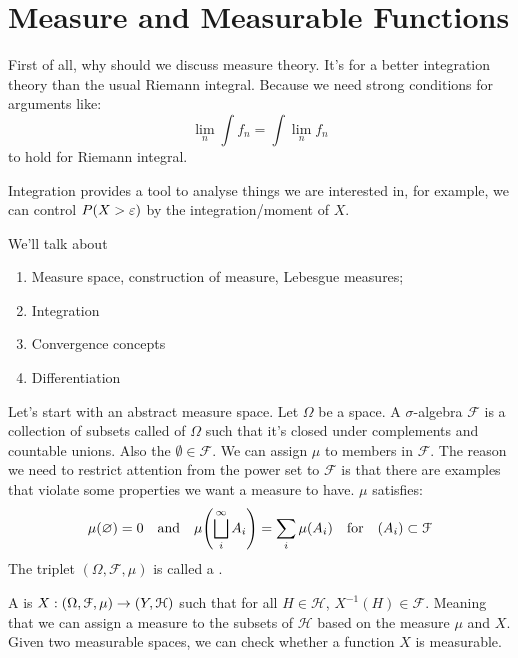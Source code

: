 \section{Measure and Measurable Functions}
First of all, why should we discuss measure theory. It's for a better integration theory than the usual Riemann integral. Because we need strong conditions for arguments like:
\begin{equation*}
    \lim_{n} \int f_{n} = \int \lim_{n} f_{n}
\end{equation*}
to hold for Riemann integral.

Integration provides a tool to analyse things we are interested in, for example, we can control \(P\pqty{X > \epsilon}\) by the integration/moment of \(X\). 

 We'll talk about
\begin{enumerate}
    \item Measure space, construction of measure, Lebesgue measures;
    \item Integration
    \item Convergence concepts 
    \item Differentiation 
\end{enumerate}

Let's start with an abstract measure space. Let \(\Omega\) be a space. A \(\sigma\)-algebra \(\mathcal{F}\) is a collection of subsets called  of \(\Omega\) such that it's closed under complements and countable unions. Also the \(\emptyset \in \mathcal{F}\). We can assign  \(\mu\) to members in \(\mathcal{F}\). The reason we need to restrict attention from the power set to \(\mathcal{F}\) is that there are examples that violate some properties we want a measure to have. \(\mu\) satisfies:
\begin{equation*}
    \mu\pqty{\emptyset} = 0 \qq{and} \mu \pqty{\sqcup_{i}^{\infty} A_{i}} = \sum_{i} \mu(A_{i}) \qq{for} (A_{i}) \subset \mathcal{F}
\end{equation*}
The triplet \((\Omega, \mathcal{F}, \mu)\) is called a .  

A  is \(X : (\Omega, \mathcal{F}, \mu) \to \pqty{Y, \mathcal{H}}\) such that for all \(H \in \mathcal{H}\), \(X^{-1}(H) \in \mathcal{F}\). Meaning that we can assign a measure to the subsets of \(\mathcal{H}\) based on the measure \(\mu\) and \(X\). 
Given two measurable spaces, we can check whether a function \(X\) is measurable. 

